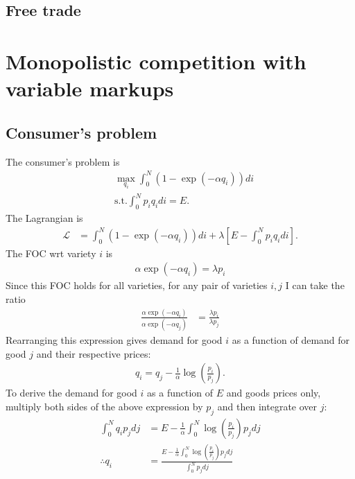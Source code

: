 \documentclass[12pt]{article}
\begin{document}
\subsection{Free trade}


\newpage

\section{Monopolistic competition with variable markups}

\subsection{Consumer's problem}
The consumer's problem is 
\begin{align*}
&\max_{q_i} \int_0^N (1-\exp(-\alpha q_i) )di\\
&\text{s.t.} \int_0^N p_i q_i di = E.
\end{align*}
The Lagrangian is
\begin{align*}
\mathcal{L} &=  \int_0^N (1-\exp(-\alpha q_i)) di + \lambda \left[ E -\int_0^N p_i q_i di \right].
\end{align*}
The FOC wrt variety $i$ is
\begin{align*}
\alpha \exp(-\alpha q_i) = \lambda p_i
\end{align*}
Since this FOC holds for all varieties, for any pair of varieties $i, j$ I can take the ratio
\begin{align*}
\frac{\alpha \exp(-\alpha q_i)}{\alpha \exp(-\alpha q_j)} & = \frac{\lambda p_i}{\lambda p_j}
\end{align*}
Rearranging this expression gives demand for good $i$ as a function of demand for good $j$ and their respective prices:
\begin{align}
q_i = q_j - \frac{1}{\alpha} \log\left(\frac{p_i}{p_j}\right). \label{eq:mpc1}
\end{align}
To derive the demand for good $i$ as a function of $E$ and goods prices only, multiply both sides of the above expression by $p_j$ and then integrate over $j$:
\begin{align}
\int_0^N q_i p_j dj &= E - \frac{1}{\alpha}\int_0^N \log\left(\frac{p_i}{p_j}\right)p_j dj \nonumber\\
\therefore q_i &=  \frac{E - \frac{1}{\alpha}\int_0^N \log\left(\frac{p_i}{p_j}\right)p_j dj}{\int_0^Np_j dj} \label{eq:mpc2a}
\end{align}
\end{document}
